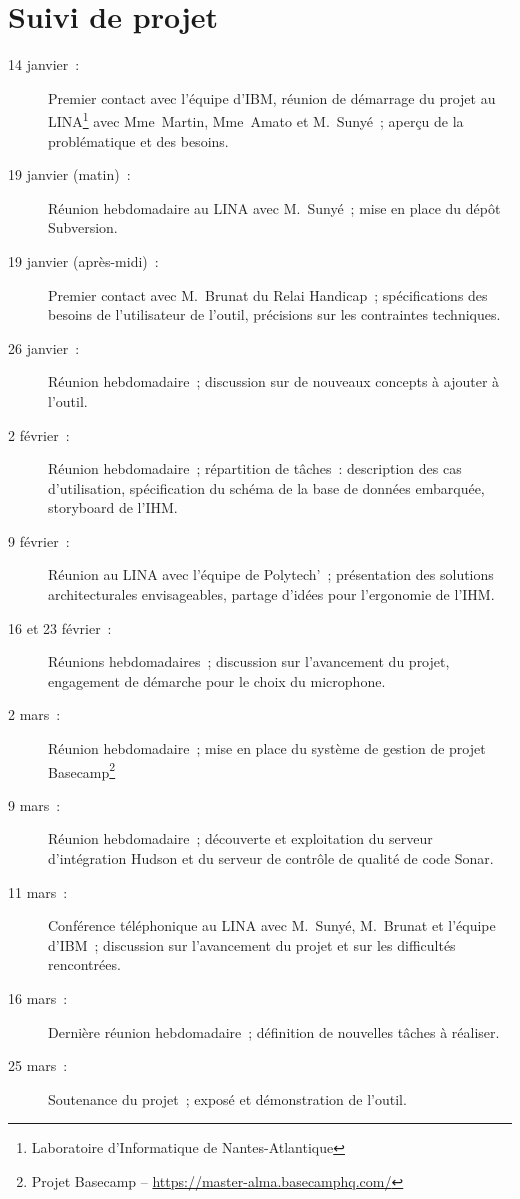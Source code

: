 \appendix

\chapter{Suivi de projet}

\begin{description}
\item[14 janvier~:] Premier contact avec l'équipe d'IBM, réunion de démarrage du projet au LINA\footnote{Laboratoire d'Informatique de Nantes-Atlantique} avec Mme~Martin, Mme~Amato et M.~Sunyé~; aperçu de la problématique et des besoins.
\item[19 janvier (matin)~:] Réunion hebdomadaire au LINA avec M.~Sunyé~; mise en place du dépôt Subversion.
\item[19 janvier (après-midi)~:] Premier contact avec M.~Brunat du Relai Handicap~; spécifications des besoins de l'utilisateur de l'outil, précisions sur les contraintes techniques.
\item[26 janvier~:] Réunion hebdomadaire~; discussion sur de nouveaux concepts à ajouter à l'outil.
\item[2 février~:] Réunion hebdomadaire~; répartition de tâches~: description des cas d'utilisation, spécification du schéma de la base de données embarquée, storyboard de l'IHM.
\item[9 février~:] Réunion au LINA avec l'équipe de Polytech'~; présentation des solutions architecturales envisageables, partage d'idées pour l'ergonomie de l'IHM.
\item[16 et 23 février~:] Réunions hebdomadaires~; discussion sur l'avancement du projet, engagement de démarche pour le choix du microphone.
\item[2 mars~:] Réunion hebdomadaire~; mise en place du système de gestion de projet Basecamp\footnote{Projet Basecamp -- \url{https://master-alma.basecamphq.com/}}
\item[9 mars~:] Réunion hebdomadaire~; découverte et exploitation du serveur d'intégration Hudson et du serveur de contrôle de qualité de code Sonar.
\item[11 mars~:] Conférence téléphonique au LINA avec M.~Sunyé, M.~Brunat et l'équipe d'IBM~; discussion sur l'avancement du projet et sur les difficultés rencontrées.
\item[16 mars~:] Dernière réunion hebdomadaire~; définition de nouvelles tâches à réaliser.
\item[25 mars~:] Soutenance du projet~; exposé et démonstration de l'outil.
\end{description}


